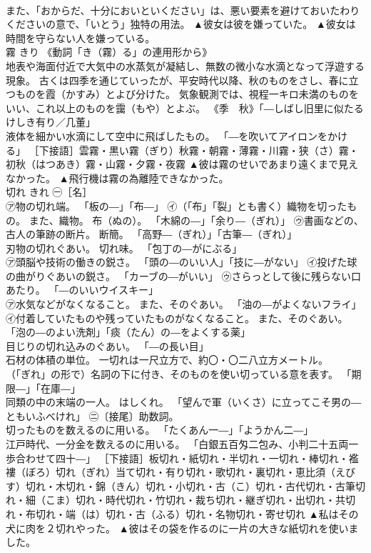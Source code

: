 \documentclass[8pt]{extreport}
\begin{document}
\begin{CJK}{UTF8}{min}
\\	また、「おからだ、十分においといください」は、悪い要素を避けておいたわりくださいの意で、「いとう」独特の用法。	▲彼女は彼を嫌っていた。 ▲彼女は時間を守らない人を嫌っている。
\\	霧	きり	《動詞「き（霧）る」の連用形から》 
\\	地表や海面付近で大気中の水蒸気が凝結し、無数の微小な水滴となって浮遊する現象。 古くは四季を通じていったが、平安時代以降、秋のものをさし、春に立つものを霞（かすみ）とよび分けた。 気象観測では、視程一キロ未満のものをいい、これ以上のものを靄（もや）とよぶ。 《季　秋》「―しばし旧里に似たるけしき有り／几董」 
\\	液体を細かい水滴にして空中に飛ばしたもの。 「―を吹いてアイロンをかける」 ［下接語］雲霧・黒い霧（ぎり）秋霧・朝霧・薄霧・川霧・狭（さ）霧・初秋（はつあき）霧・山霧・夕霧・夜霧	▲彼は霧のせいであまり遠くまで見えなかった。 ▲飛行機は霧の為離陸できなかった。
\\	切れ	きれ	㊀［名］ 
\\	㋐物の切れ端。 「板の―」「布―」 ㋑（「布」「裂」とも書く）織物を切ったもの。 また、織物。 布（ぬの）。 「木綿の―」「余り―（ぎれ）」 ㋒書画などの、古人の筆跡の断片。 断簡。 「高野―（ぎれ）」「古筆―（ぎれ）」 
\\	刃物の切れぐあい。 切れ味。 「包丁の―がにぶる」 
\\	㋐頭脳や技術の働きの鋭さ。 「頭の―のいい人」「技に―がない」 ㋑投げた球の曲がりぐあいの鋭さ。 「カーブの―がいい」 ㋒さらっとして後に残らない口あたり。 「―のいいウイスキー」 
\\	㋐水気などがなくなること。 また、そのぐあい。 「油の―がよくないフライ」 ㋑付着していたものや残っていたものがなくなること。 また、そのぐあい。 「泡の―のよい洗剤」「痰（たん）の―をよくする薬」 
\\	目じりの切れ込みのぐあい。 「―の長い目」 
\\	石材の体積の単位。 一切れは一尺立方で、約〇・〇二八立方メートル。 
\\	（「ぎれ」の形で）名詞の下に付き、そのものを使い切っている意を表す。 「期限―」「在庫―」 
\\	同類の中の末端の一人。 はしくれ。 「望んで軍（いくさ）に立ってこそ男の―ともいふべけれ」 ㊁〔接尾〕助数詞。 
\\	切ったものを数えるのに用いる。 「たくあん一―」「ようかん二―」 
\\	江戸時代、一分金を数えるのに用いる。 「白銀五百匁二包み、小判二十五両一歩合わせて四十―」 ［下接語］板切れ・紙切れ・半切れ・一切れ・棒切れ・襤褸（ぼろ）切れ（ぎれ）当て切れ・有り切れ・歌切れ・裏切れ・恵比須（えびす）切れ・木切れ・錦（きん）切れ・小切れ・古（こ）切れ・古代切れ・古筆切れ・細（こま）切れ・時代切れ・竹切れ・裁ち切れ・継ぎ切れ・出切れ・共切れ・布切れ・端（は）切れ・古（ふる）切れ・名物切れ・寄せ切れ	▲私はその犬に肉を２切れやった。 ▲彼はその袋を作るのに一片の大きな紙切れを使いました。

\end{CJK}
\end{document}
